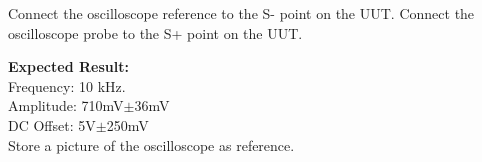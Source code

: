 Connect the oscilloscope reference to the S- point on the UUT.
Connect the oscilloscope probe to the S+ point on the UUT.


\begin{figure}[H]
	\centering
\end{figure}

\textbf{Expected Result:}\\
Frequency: 10 kHz.\\
Amplitude: 710mV$\pm$36mV\\
DC Offset: 5V$\pm$250mV\\
Store a picture of the oscilloscope as reference.


